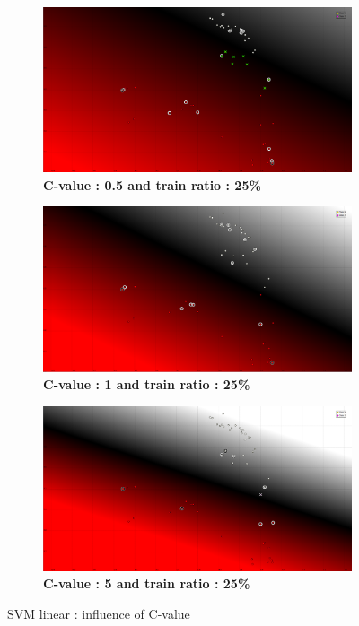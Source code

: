 \begin{figure}[ht]
\centering
\begin{subfigure}[h]{0.31\textwidth}
\includegraphics[height=0.11\textheight]{./classification/SVM_linear_c_0_5_TR_25_.png}
\caption{\bf C-value : 0.5 and train ratio : 25\%}
\end{subfigure}
\begin{subfigure}[h]{0.31\textwidth}
\includegraphics[height=0.11\textheight]{./classification/SVM_linear_c_1_TR_25_.png}
\caption{\bf C-value : 1 and train ratio : 25\%}
\end{subfigure}
\begin{subfigure}[h]{0.31\textwidth}
\includegraphics[height=0.11\textheight]{./classification/SVM_linear_c_5_TR_25_.png}
\caption{\bf C-value : 5 and train ratio : 25\%}
\label{fig:SVM_linear_C_value_5}
\end{subfigure}
\caption{SVM linear : influence of C-value}
\label{fig:SVM_linear_C_value}
\end{figure}

